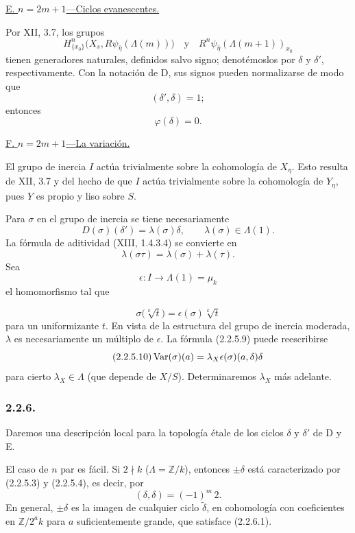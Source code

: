 \medskip
\noindent\underline{E. $n=2m+1$---Ciclos evanescentes.}

Por XII, 3.7, los grupos
\[
H^n_{\{x_0\}}\bigl(X_s,R\psi_{\bar\eta}(\Lambda(m))\bigr)
\quad\text{y}\quad
R^n\psi_{\bar\eta}(\Lambda(m+1))_{x_0}
\]
tienen generadores naturales, definidos salvo signo; denotémoslos por
$\delta$ y $\delta'$, respectivamente. Con la notación de D, sus signos
pueden normalizarse de modo que
\begin{equation}\tag{2.2.5.7}
(\delta',\delta)=1;
\end{equation}
entonces
\begin{equation}\tag{2.2.5.8}
\varphi(\delta)=0.
\end{equation}

\medskip
\noindent\underline{F. $n=2m+1$---La variación.}

El grupo de inercia $I$ actúa trivialmente sobre la cohomología de
$X_\eta$. Esto resulta de XII, 3.7 y del hecho de que $I$ actúa
trivialmente sobre la cohomología de $Y_\eta$, pues $Y$ es propio y
liso sobre $S$.

Para $\sigma$ en el grupo de inercia se tiene necesariamente
\begin{equation}\tag{2.2.5.9}
D(\sigma)(\delta')=\lambda(\sigma)\delta,
\qquad \lambda(\sigma)\in\Lambda(1).
\end{equation}
La fórmula de aditividad (XIII, 1.4.3.4) se convierte en
\[
\lambda(\sigma\tau)=\lambda(\sigma)+\lambda(\tau).
\]
Sea
\[
\epsilon:I\longrightarrow\Lambda(1)=\mu_k
\]
el homomorfismo tal que

\pageoriginale

\[
\sigma\bigl(\sqrt[k]{t}\bigr)
=\epsilon(\sigma)\sqrt[k]{t}
\]
para un uniformizante $t$. En vista de la estructura del grupo de
inercia moderada, $\lambda$ es necesariamente un múltiplo de $\epsilon$.
La fórmula (2.2.5.9) puede reescribirse
\begin{equation}\tag{2.2.5.10}
\operatorname{Var}(\sigma)(a)
=\lambda_X\epsilon(\sigma)\sisi{(a\delta)}{(a,\delta)}\delta
\end{equation}
para cierto $\lambda_X\in\Lambda$ (que depende de $X/S$).
Determinaremos $\lambda_X$ más adelante.

\subsubsection*{2.2.6.}
Daremos una descripción local para la topología étale de los ciclos
$\delta$ y $\delta'$ de D y E.

El caso de $n$ par es fácil. Si $2\nmid k$
($\Lambda=\mathbb Z/k$), entonces $\pm\delta$ está caracterizado por
(2.2.5.3) y (2.2.5.4), es decir, por
\begin{equation}\tag{2.2.6.1}
(\delta,\delta)=(-1)^m\,2.
\end{equation}
En general, $\pm\delta$ es la imagen de cualquier ciclo
$\widetilde\delta$, en cohomología con coeficientes en
$\mathbb Z/2^ak$ para $a$ suficientemente grande, que satisface
(2.2.6.1).

